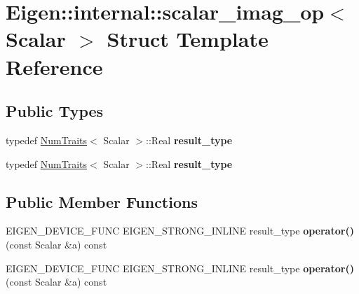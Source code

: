 \hypertarget{struct_eigen_1_1internal_1_1scalar__imag__op}{}\section{Eigen\+:\+:internal\+:\+:scalar\+\_\+imag\+\_\+op$<$ Scalar $>$ Struct Template Reference}
\label{struct_eigen_1_1internal_1_1scalar__imag__op}
\subsection*{Public Types}
\begin{DoxyCompactItemize}
\item 
\mbox{\label{struct_eigen_1_1internal_1_1scalar__imag__op_a9477d3b8605e2e6104af1b3a9537c6ac}} 
typedef \hyperlink{group___core___module_struct_eigen_1_1_num_traits}{Num\+Traits}$<$ Scalar $>$\+::Real {\bfseries result\+\_\+type}
\item 
\mbox{\label{struct_eigen_1_1internal_1_1scalar__imag__op_a9477d3b8605e2e6104af1b3a9537c6ac}} 
typedef \hyperlink{group___core___module_struct_eigen_1_1_num_traits}{Num\+Traits}$<$ Scalar $>$\+::Real {\bfseries result\+\_\+type}
\end{DoxyCompactItemize}
\subsection*{Public Member Functions}
\begin{DoxyCompactItemize}
\item 
\mbox{\label{struct_eigen_1_1internal_1_1scalar__imag__op_afb93c381d61e53ab406e1ca6913b3bfb}} 
E\+I\+G\+E\+N\+\_\+\+D\+E\+V\+I\+C\+E\+\_\+\+F\+U\+NC E\+I\+G\+E\+N\+\_\+\+S\+T\+R\+O\+N\+G\+\_\+\+I\+N\+L\+I\+NE result\+\_\+type {\bfseries operator()} (const Scalar \&a) const
\item 
\mbox{\label{struct_eigen_1_1internal_1_1scalar__imag__op_afb93c381d61e53ab406e1ca6913b3bfb}} 
E\+I\+G\+E\+N\+\_\+\+D\+E\+V\+I\+C\+E\+\_\+\+F\+U\+NC E\+I\+G\+E\+N\+\_\+\+S\+T\+R\+O\+N\+G\+\_\+\+I\+N\+L\+I\+NE result\+\_\+type {\bfseries operator()} (const Scalar \&a) const
\end{DoxyCompactItemize}


